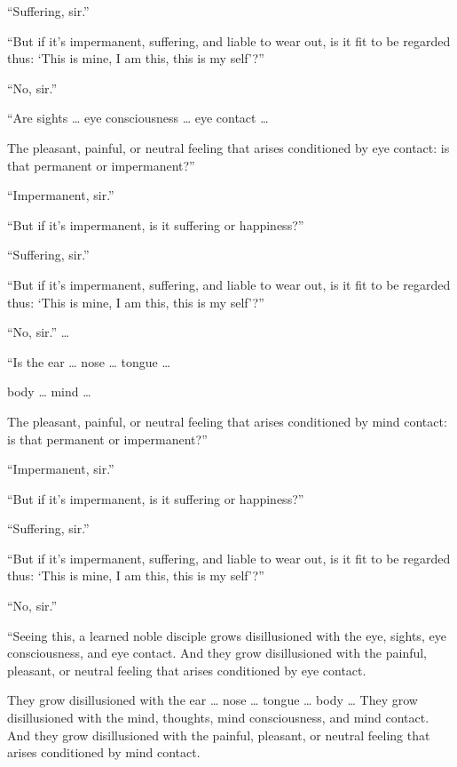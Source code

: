 \documentclass[12pt,openany]{book}%
\begin{document}
“Suffering, sir.” 

“But if it’s impermanent, suffering, and liable to wear out, is it fit to be regarded thus: ‘This is mine, I am this, this is my self’?” 

“No, sir.” 

“Are sights … eye consciousness … eye contact … 

The pleasant, painful, or neutral feeling that arises conditioned by eye contact: is that permanent or impermanent?” 

“Impermanent, sir.” 

“But if it’s impermanent, is it suffering or happiness?” 

“Suffering, sir.” 

“But if it’s impermanent, suffering, and liable to wear out, is it fit to be regarded thus: ‘This is mine, I am this, this is my self’?” 

“No, sir.” … 

“Is the ear … nose … tongue … 

body … mind … 

The pleasant, painful, or neutral feeling that arises conditioned by mind contact: is that permanent or impermanent?” 

“Impermanent, sir.” 

“But if it’s impermanent, is it suffering or happiness?” 

“Suffering, sir.” 

“But if it’s impermanent, suffering, and liable to wear out, is it fit to be regarded thus: ‘This is mine, I am this, this is my self’?” 

“No, sir.” 

“Seeing this, a learned noble disciple grows disillusioned with the eye, sights, eye consciousness, and eye contact. And they grow disillusioned with the painful, pleasant, or neutral feeling that arises conditioned by eye contact. 

They grow disillusioned with the ear … nose … tongue … body … They grow disillusioned with the mind, thoughts, mind consciousness, and mind contact. And they grow disillusioned with the painful, pleasant, or neutral feeling that arises conditioned by mind contact. 
\end{document}
